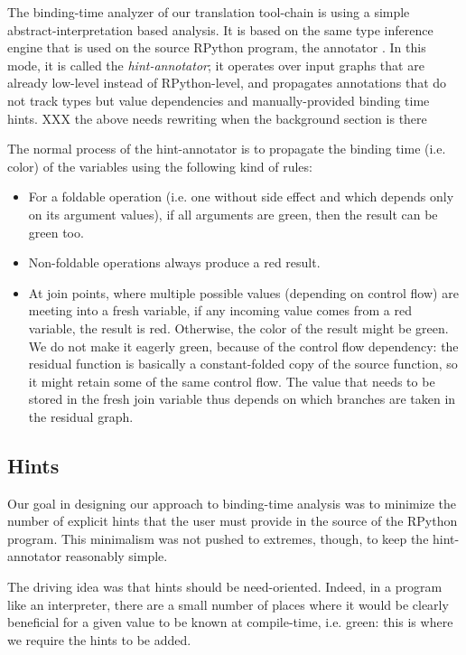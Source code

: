 The binding-time analyzer of our translation tool-chain is using a simple
abstract-interpretation based analysis. It is based on the
same type inference engine that is used on the source RPython program,
the annotator .  In this mode, it is called the \emph{hint-annotator}; it
operates over input graphs that are already low-level instead of
RPython-level, and propagates annotations that do not track types but
value dependencies and manually-provided binding time hints.
XXX the above needs rewriting when the background section is there

The normal process of the hint-annotator is to propagate the binding
time (i.e. color) of the variables using the following kind of rules:

\begin{itemize}
\item For a foldable operation (i.e. one without side effect and which depends
only on its argument values), if all arguments are green, then the result can
be green too.

\item Non-foldable operations always produce a red result.

\item At join points, where multiple possible values (depending on control
flow) are meeting into a fresh variable, if any incoming value comes from a red
variable, the result is red.  Otherwise, the color of the result might be
green.  We do not make it eagerly green, because of the control flow
dependency: the residual function is basically a constant-folded copy of the
source function, so it might retain some of the same control flow.  The value
that needs to be stored in the fresh join variable thus depends on which
branches are taken in the residual graph.
\end{itemize}

\subsection{Hints}

Our goal in designing our approach to binding-time analysis was to
minimize the number of explicit hints that the user must provide in
the source of the RPython program.  This minimalism was not pushed to
extremes, though, to keep the hint-annotator reasonably simple.  

The driving idea was that hints should be need-oriented.  Indeed, in a
program like an interpreter, there are a small number of places where it
would be clearly beneficial for a given value to be known at
compile-time, i.e. green: this is where we require the hints to be
added.

